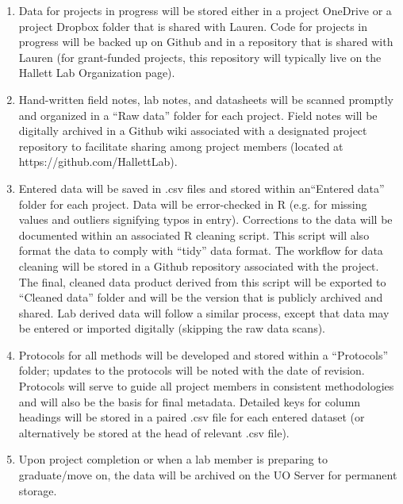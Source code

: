 \documentclass[12pt]{article}
\begin{document}
\begin{enumerate}
\item Data for projects in progress will be stored either in a project OneDrive or a project Dropbox folder that is shared with Lauren. Code for projects in progress will be backed up on Github and in a repository that is shared with Lauren (for grant-funded projects, this repository will typically live on the Hallett Lab Organization page).
\item Hand-written field notes, lab notes, and datasheets will be scanned promptly and organized in a “Raw data” folder for each project. Field notes will be digitally archived in a Github wiki associated with a designated project repository to facilitate sharing among project members (located at https://github.com/HallettLab).
\item Entered data will be saved in .csv files and stored within an``Entered data'' folder for each project. Data will be error-checked in R (e.g. for missing values and outliers signifying typos in entry). Corrections to the data will be documented within an associated R cleaning script. This script will also format the data to comply with ``tidy'' data format. The workflow for data cleaning will be stored in a Github repository associated with the project. The final, cleaned data product derived from this script will be exported to ``Cleaned data'' folder and will be the version that is publicly archived and shared. Lab derived data will follow a similar process, except that data may be entered or imported digitally (skipping the raw data scans).
\item Protocols for all methods will be developed and stored within a ``Protocols'' folder; updates to the protocols will be noted with the date of revision. Protocols will serve to guide all project members in consistent methodologies and will also be the basis for final metadata. Detailed keys for column headings will be stored in a paired .csv file for each entered dataset (or alternatively be stored at the head of relevant .csv file).
\item Upon project completion or when a lab member is preparing to graduate/move on, the data will be archived on the UO Server for permanent storage. 

\end{enumerate}
\end{document}

